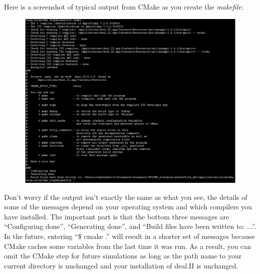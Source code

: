 \documentclass[10pt]{article} %
\begin{document}
Here is a screenshot of typical output from CMake as you create the \emph{makefile}:
\begin{figure}[H]
\vspace{0pt}
\hspace{-2cm}
\includegraphics[width=1.3\textwidth,trim={0 0 3cm 0},clip]{cmake_output}
\vspace{0pt}
\end{figure}
Don't worry if the output isn't exactly the same as what you see, the details of some of the messages depend on your operating system and which compilers you have installed. The important part is that the bottom three messages are ``Configuring done'', ``Generating done'', and ``Build files have been written to: ...''. In the future, entering ``\$ cmake .'' will result in a shorter set of messages because CMake caches some variables from the last time it was run. As a result, you can omit the CMake step for future simulations as long as the path name to your current directory is unchanged and your installation of deal.II is unchanged.
\end{document}
